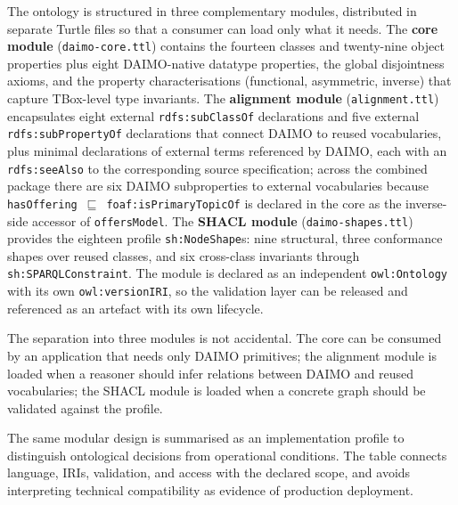 \documentclass[Afour,sagev,times]{sagej}
\newcommand{\code}[1]{\texttt{#1}}
\begin{document}
The ontology is structured in three complementary modules, distributed in separate Turtle files so that a consumer can load only what it needs. The \textbf{core module} (\code{daimo-core.ttl}) contains the fourteen classes and twenty-nine object properties plus eight DAIMO-native datatype properties, the global disjointness axioms, and the property characterisations (functional, asymmetric, inverse) that capture TBox-level type invariants. The \textbf{alignment module} (\code{alignment.ttl}) encapsulates eight external \code{rdfs:subClassOf} declarations and five external \code{rdfs:subPropertyOf} declarations that connect DAIMO to reused vocabularies, plus minimal declarations of external terms referenced by DAIMO, each with an \code{rdfs:seeAlso} to the corresponding source specification; across the combined package there are six DAIMO subproperties to external vocabularies because \code{hasOffering}~$\sqsubseteq$~\code{foaf:isPrimaryTopicOf} is declared in the core as the inverse-side accessor of \code{offersModel}. The \textbf{SHACL module} (\code{daimo-shapes.ttl}) provides the eighteen profile \code{sh:NodeShape}s: nine structural, three conformance shapes over reused classes, and six cross-class invariants through \code{sh:SPARQLConstraint}. The module is declared as an independent \code{owl:Ontology} with its own \code{owl:versionIRI}, so the validation layer can be released and referenced as an artefact with its own lifecycle.

The separation into three modules is not accidental. The core can be consumed by an application that needs only DAIMO primitives; the alignment module is loaded when a reasoner should infer relations between DAIMO and reused vocabularies; the SHACL module is loaded when a concrete graph should be validated against the profile.

The same modular design is summarised as an implementation profile to distinguish ontological decisions from operational conditions. The table connects language, IRIs, validation, and access with the declared scope, and avoids interpreting technical compatibility as evidence of production deployment.
\end{document}
